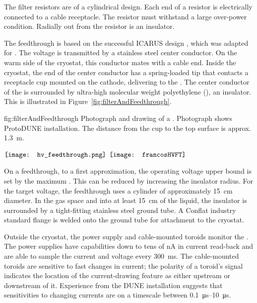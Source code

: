 The %
filter resistors are of a cylindrical design. 
Each end of a  resistor is electrically connected to a cable receptacle. 
The resistor %
must withstand a large over-power condition.  Radially out from the resistor is an insulator. 

The  feedthrough %
is based on the successful ICARUS design \cite{Icarus-T600}, 
which was adapted for .  The voltage is transmitted by a stainless steel center conductor.  On the warm side of the cryostat, this conductor mates with a cable end.  Inside the cryostat, the end of the center conductor has a spring-loaded tip that %
contacts a receptacle cup mounted on the cathode, delivering  to the .  The center conductor of the \fdth is surrounded by ultra-high molecular weight polyethylene (), an insulator. This is illustrated in Figure~\ref{fig:filterAndFeedthrough}.

\begin{dunefigure}{fig:filterAndFeedthrough}
{Photograph and drawing of a  \fdth{}. Photograph shows ProtoDUNE installation. The distance from the cup to the top surface is approx. \SI{1.3}{\meter}. } 
\begin{minipage}{\textwidth}%
  \centering
 $\vcenter{\hbox{\texttt{[image: hv\_feedthrough.png]}}}$
 \hspace*{0.001\textwidth}  $\vcenter{\hbox{\texttt{[image: francosHVFT]}}}$
\end{minipage}
\end{dunefigure}

On a feedthrough, to a first approximation, the operating voltage upper bound is set by the maximum \efield{}. This \efield{} can be reduced by increasing the insulator radius.  For the target voltage, the feedthrough uses a  cylinder of approximately \SI{15}{cm} diameter.  In the gas space and into at least \SI{15}{\centi\meter} of the liquid, the insulator is surrounded by a tight-fitting stainless steel ground tube.  A %
Conflat industry standard flange is welded onto the ground tube for attachment to the cryostat.

Outside the cryostat, the  power supply and cable-mounted toroids monitor the .    The power supplies 
have capabilities down to tens of \si{\nano\ampere} in current read-back 
and are able to sample the current and voltage every \SI{300}{\ms}.  The cable-mounted toroids are sensitive to fast changes in current;  
the polarity of a toroid's signal  
indicates the location of the current-drawing feature as either upstream or downstream of it.  Experience from the DUNE  installation suggests that sensitivities to changing currents %
are on a timescale between \SIrange{0.1}{10}{\micro\s}.

